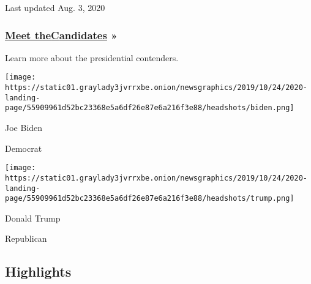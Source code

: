 Last updated Aug. 3, 2020

\hypertarget{meet-thecandidates-}{%
\subsubsection{\texorpdfstring{\href{https://www.nytimes3xbfgragh.onion/interactive/2019/us/politics/2020-presidential-candidates.html}{Meet
the}\href{https://www.nytimes3xbfgragh.onion/interactive/2019/us/politics/2020-presidential-candidates.html}{C}\href{https://www.nytimes3xbfgragh.onion/interactive/2019/us/politics/2020-presidential-candidates.html}{andidates}
»}{Meet theCandidates »}}\label{meet-thecandidates-}}

Learn more about the presidential contenders.

\href{https://www.nytimes3xbfgragh.onion/interactive/2020/us/elections/joe-biden.html}{}

\texttt{[image: https://static01.graylady3jvrrxbe.onion/newsgraphics/2019/10/24/2020-landing-page/55909961d52bc23368e5a6df26e87e6a216f3e88/headshots/biden.png]}

Joe Biden

Democrat

\href{https://www.nytimes3xbfgragh.onion/interactive/2020/us/elections/donald-trump.html}{}

\texttt{[image: https://static01.graylady3jvrrxbe.onion/newsgraphics/2019/10/24/2020-landing-page/55909961d52bc23368e5a6df26e87e6a216f3e88/headshots/trump.png]}

Donald Trump

Republican

\hypertarget{highlights}{%
\subsection{Highlights}\label{highlights}}

